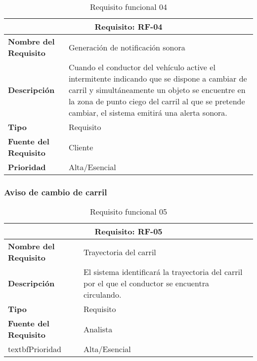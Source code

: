 \begin{table}[H]
\begin{center}
\begin{tabular}{p{} p{7cm}}
\multicolumn{2}{c}{\textbf{Requisito: RF-04} } \\
\hline \hline
\textbf{Nombre del Requisito} & Generación de notificación sonora \\
\hline
\textbf{Descripción} &  Cuando el conductor del vehículo active el intermitente indicando que se dispone a cambiar de carril y simultáneamente un objeto se encuentre en la zona de punto ciego del carril al que se pretende cambiar, el sistema emitirá una alerta sonora. \\
\hline
\textbf{Tipo} & Requisito  \\
\hline
\textbf{Fuente del Requisito} & Cliente  \\
\hline
\textbf{Prioridad} & Alta/Esencial  \\ \hline
\end{tabular}
\caption{Requisito funcional 04}
\label{tab:RF-04}
\end{center}
\end{table}


\subsubsection{Aviso de cambio de carril}

\begin{table}[H]
\begin{center}
\begin{tabular}{p{} p{7cm}}
\multicolumn{2}{c}{\textbf{Requisito: RF-05} } \\
\hline \hline
\textbf{Nombre del Requisito} & Trayectoria del carril\\
\hline
\textbf{Descripción} & El sistema identificará la trayectoria del carril por el que el conductor se encuentra circulando. \\
\hline
\textbf{Tipo} & Requisito  \\
\hline
\textbf{Fuente del Requisito} & Analista \\
\hline
textbf{Prioridad} & Alta/Esencial  \\ \hline
\end{tabular}
\caption{Requisito funcional 05}
\label{tab:RF-05}
\end{center}
\end{table}

